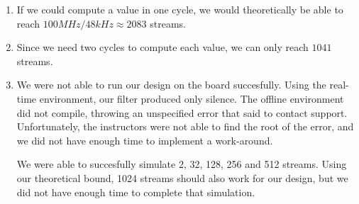 
\begin{enumerate}
	\item %
		If we could compute a value in one cycle, we would theoretically be able to reach $100MHz/48kHz \approx 2083$ streams.
	\item %
		Since we need two cycles to compute each value, we can only reach $1041$ streams.
	\item %
		We were not able to run our design on the board succesfully.
		Using the real-time environment, our filter produced only silence.
		The offline environment did not compile, throwing an unspecified error that said to contact support.
		Unfortunately, the instructors were not able to find the root of the error, and we did not have enough time to implement a work-around.

		We were able to succesfully simulate 2, 32, 128, 256 and 512 streams.
		Using our theoretical bound, 1024 streams should also work for our design, but we did not have enough time to complete that simulation.
\end{enumerate}
